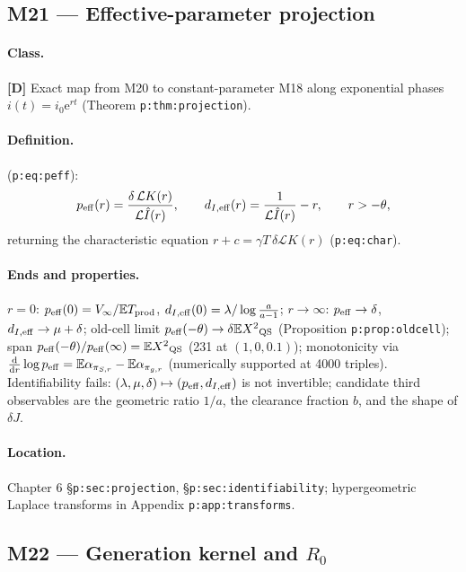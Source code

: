 \documentclass[11pt,a4paper]{article}
\newcommand{\EX}{\mathbb{E}}
\newcommand{\ee}{\mathrm{e}}
\newcommand{\dd}{\mathrm{d}}
\newcommand{\Lap}{\mathcal{L}}      %
\begin{document}
\subsection{M21 --- Effective-parameter projection }

\paragraph{Class.} \textbf{[D]} Exact map from M20 to constant-parameter
M18 along exponential phases $i(t)=i_0\ee^{rt}$
(Theorem \texttt{p:thm:projection}).

\paragraph{Definition.} (\texttt{p:eq:peff}):
\[
p_{\rm eff}(r)=\frac{\delta\,\Lap K(r)}{\Lap{\hat I}(r)},
\qquad
d_{I,\rm eff}(r)=\frac{1}{\Lap{\hat I}(r)}-r,
\qquad r>-\theta,
\]
returning the characteristic equation $r+c=\gamma T\,\delta\Lap K(r)$
(\texttt{p:eq:char}).

\paragraph{Ends and properties.} $r=0$: $p_{\rm eff}(0)=V_\infty/\EX{T_{\rm
prod}}$, $d_{I,\rm eff}(0)=\lambda/\log\frac{a}{a-1}$; $r\to\infty$:
$p_{\rm eff}\to\delta$, $d_{I,\rm eff}\to\mu+\delta$; old-cell limit
$p_{\rm eff}(-\theta)\to\delta\EX{X^2}_{\rm QS}$ (Proposition
\texttt{p:prop:oldcell}); span $p_{\rm eff}(-\theta)/p_{\rm eff}(\infty)
=\EX{X^2}_{\rm QS}$ (231 at $(1,0,0.1)$); monotonicity via
$\frac{\dd}{\dd r}\log p_{\rm eff}=\EX{\alpha}_{\pi_{S,r}}-\EX{\alpha}_
{\pi_{g,r}}$ (numerically supported at 4000 triples). Identifiability
fails: $(\lambda,\mu,\delta)\mapsto(p_{\rm eff},d_{I,\rm eff})$ is not
invertible; candidate third observables are the geometric ratio $1/a$, the
clearance fraction $b$, and the shape of $\delta J$.

\paragraph{Location.} Chapter 6 \S\texttt{p:sec:projection},
\S\texttt{p:sec:identifiability}; hypergeometric Laplace transforms in
Appendix \texttt{p:app:transforms}.

\subsection{M22 --- Generation kernel and $R_0$ }
\end{document}
